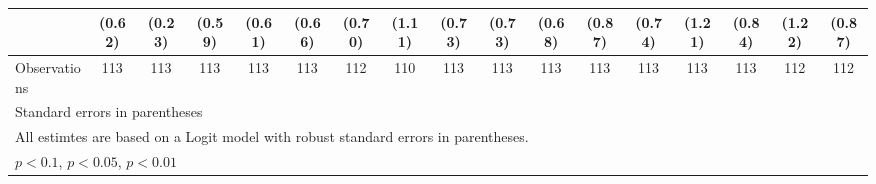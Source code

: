 \begin{table}[htbp]
\begin{tabular*}{0.8\hsize}{@{\hskip\tabcolsep\extracolsep\fill}l*{16}{c}}
                    &      (0.62)         &      (0.23)         &      (0.59)         &      (0.61)         &      (0.66)         &      (0.70)         &      (1.11)         &      (0.73)         &      (0.73)         &      (0.68)         &      (0.87)         &      (0.74)         &      (1.21)         &      (0.84)         &      (1.22)         &      (0.87)         \\
\hline
Observations        &         113         &         113         &         113         &         113         &         113         &         112         &         110         &         113         &         113         &         113         &         113         &         113         &         113         &         113         &         112         &         112         \\
\hline\hline
\multicolumn{17}{l}{\footnotesize Standard errors in parentheses}\\
\multicolumn{17}{l}{\footnotesize All estimtes are based on a Logit model with robust standard errors in parentheses.}\\
\multicolumn{17}{l}{\footnotesize \sym{*} \(p<0.1\), \sym{**} \(p<0.05\), \sym{***} \(p<0.01\)}\\
\end{tabular*}
\end{table}
